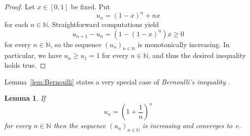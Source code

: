 \documentclass[12pt,a4paper]{article}
\newcommand{\bN}{\mathbb{N}}
\newtheorem{lemma}{Lemma}
\begin{document}
\begin{proof}
  Let $x \in [0, 1]$ be fixed.
  Put
  $$
  u _n =  \left( 1 - x \right)^n + n x  
  $$
  for each $n \in \bN$.
  Straightforward computations yield
  $$
  u_{n + 1} - u_n = \left(1 - {(1 - x)}^n \right) x \ge 0
  $$
  for every $n \in \bN$,
  so the sequence $\left( u_n \right)_{n \in \bN}$ is monotonically increasing.
  In particular, we have $u_n \ge u_1 = 1$ for every $n \in \bN$,
  and thus the desired inequality holds true.  
\end{proof}


Lemma~\ref{lem:Bernoulli} states a very special case of \emph{Bernoulli's inequality} \cite{MitrinovicAI}.

\begin{lemma} \label{lem:convergence-to-e}
  If
  $$
  u_n = \left( 1 + \frac{1}{n} \right)^n
  $$
  for every $n \in \bN$ then the sequence $\left( u_n  \right)_{n \in \bN}$ is increasing and converges to~$e$.
\end{lemma}
\end{document}
